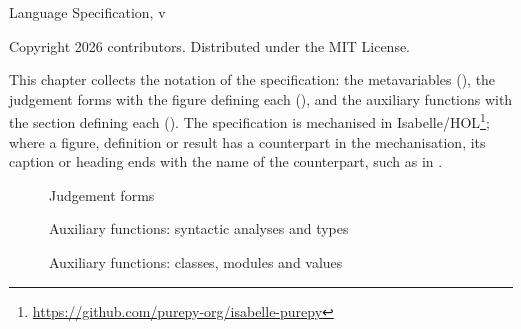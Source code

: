 \documentclass[a4paper,10pt,DIV=12,twoside=false,numbers=noenddot,appendixprefix=true]{scrreprt}
\theoremstyle{plain}
\theoremstyle{definition}
\begin{document}
\begin{titlepage}
\raggedright
\vspace*{50mm}
{\Huge\bfseries \PurePy\par}
\vspace{5mm}
{\LARGE Language Specification, v\versionstring\par}
\vfill
{\small Copyright \textcopyright{} 2026 \PurePy contributors. Distributed under the MIT License.\par}
\end{titlepage}

{\hypersetup{linkcolor=black}\tableofcontents}

\label{ch:summary}

\renewcommand*{\thefigure}{S\arabic{figure}}
\setcounter{figure}{0}

This chapter collects the notation of the specification: the metavariables
(), the judgement forms with the figure defining each
(), and the auxiliary functions with the section defining each
(). The specification is mechanised in
Isabelle/HOL\ifdefined\anonmode\else\footnote{\url{https://github.com/purepy-org/isabelle-purepy}}\fi; where a figure,
definition or result has a counterpart in the mechanisation, its caption or heading ends with the name of the
counterpart, such as  in .



\begin{figure}

\caption{Judgement forms}
\label{fig:judgement-index}
\end{figure}

\begin{figure}
\begin{auxindex}
\end{auxindex}
\caption{Auxiliary functions: syntactic analyses and types}
\label{fig:auxiliary-index}
\end{figure}

\begin{figure}
\begin{auxindex}
\end{auxindex}
\caption{Auxiliary functions: classes, modules and values}
\label{fig:auxiliary-index-values}
\end{figure}
\end{document}
